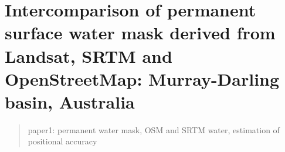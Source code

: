 \chapter{Intercomparison of permanent surface water mask derived from Landsat, SRTM and OpenStreetMap: Murray-Darling basin, Australia}
\label{ch8}

\begin{abstract}
paper1: permanent water mask, OSM and SRTM water, estimation of positional accuracy
\end{abstract}

\newpage
